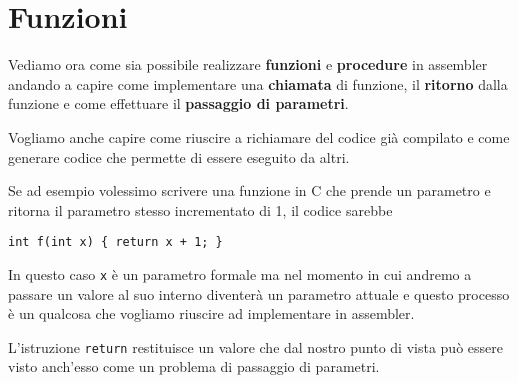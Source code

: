 \section{Funzioni}
Vediamo ora come sia possibile realizzare \textbf{funzioni} e \textbf{procedure} in assembler
andando a capire come implementare una \textbf{chiamata} di funzione, il \textbf{ritorno} dalla
funzione e come effettuare il \textbf{passaggio di parametri}.

Vogliamo anche capire come riuscire a richiamare del codice già compilato e come generare codice
che permette di essere eseguito da altri.

Se ad esempio volessimo scrivere una funzione in C che prende un parametro e ritorna il parametro
stesso incrementato di 1, il codice sarebbe
\begin{verbatim}
int f(int x) { return x + 1; }
\end{verbatim}
In questo caso \verb|x| è un parametro formale ma nel momento in cui andremo a passare un valore
al suo interno diventerà un parametro attuale e questo processo è un qualcosa che vogliamo riuscire
ad implementare in assembler.

L'istruzione \verb|return| restituisce un valore che dal nostro punto di vista può essere visto
anch'esso come un problema di passaggio di parametri.
